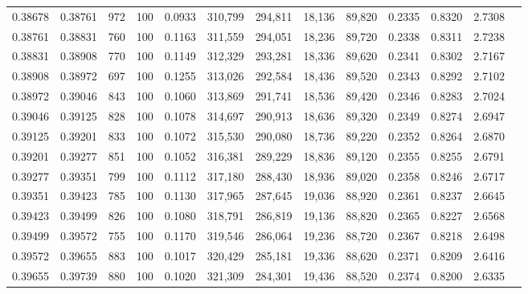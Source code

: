 \begin{tabular}{rrrrrrrrrrrrr}
0.38678 & 0.38761 &   972 & 100 &                                     0.0933 & 310,799 & 294,811 &  18,136 &  89,820 & 0.2335 & 0.8320 & 2.7308 \\
0.38761 & 0.38831 &   760 & 100 &                                     0.1163 & 311,559 & 294,051 &  18,236 &  89,720 & 0.2338 & 0.8311 & 2.7238 \\
0.38831 & 0.38908 &   770 & 100 &                                     0.1149 & 312,329 & 293,281 &  18,336 &  89,620 & 0.2341 & 0.8302 & 2.7167 \\
0.38908 & 0.38972 &   697 & 100 &                                     0.1255 & 313,026 & 292,584 &  18,436 &  89,520 & 0.2343 & 0.8292 & 2.7102 \\
0.38972 & 0.39046 &   843 & 100 &                                     0.1060 & 313,869 & 291,741 &  18,536 &  89,420 & 0.2346 & 0.8283 & 2.7024 \\
0.39046 & 0.39125 &   828 & 100 &                                     0.1078 & 314,697 & 290,913 &  18,636 &  89,320 & 0.2349 & 0.8274 & 2.6947 \\
0.39125 & 0.39201 &   833 & 100 &                                     0.1072 & 315,530 & 290,080 &  18,736 &  89,220 & 0.2352 & 0.8264 & 2.6870 \\
0.39201 & 0.39277 &   851 & 100 &                                     0.1052 & 316,381 & 289,229 &  18,836 &  89,120 & 0.2355 & 0.8255 & 2.6791 \\
0.39277 & 0.39351 &   799 & 100 &                                     0.1112 & 317,180 & 288,430 &  18,936 &  89,020 & 0.2358 & 0.8246 & 2.6717 \\
0.39351 & 0.39423 &   785 & 100 &                                     0.1130 & 317,965 & 287,645 &  19,036 &  88,920 & 0.2361 & 0.8237 & 2.6645 \\
0.39423 & 0.39499 &   826 & 100 &                                     0.1080 & 318,791 & 286,819 &  19,136 &  88,820 & 0.2365 & 0.8227 & 2.6568 \\
0.39499 & 0.39572 &   755 & 100 &                                     0.1170 & 319,546 & 286,064 &  19,236 &  88,720 & 0.2367 & 0.8218 & 2.6498 \\
0.39572 & 0.39655 &   883 & 100 &                                     0.1017 & 320,429 & 285,181 &  19,336 &  88,620 & 0.2371 & 0.8209 & 2.6416 \\
0.39655 & 0.39739 &   880 & 100 &                                     0.1020 & 321,309 & 284,301 &  19,436 &  88,520 & 0.2374 & 0.8200 & 2.6335 \\

\end{tabular}
